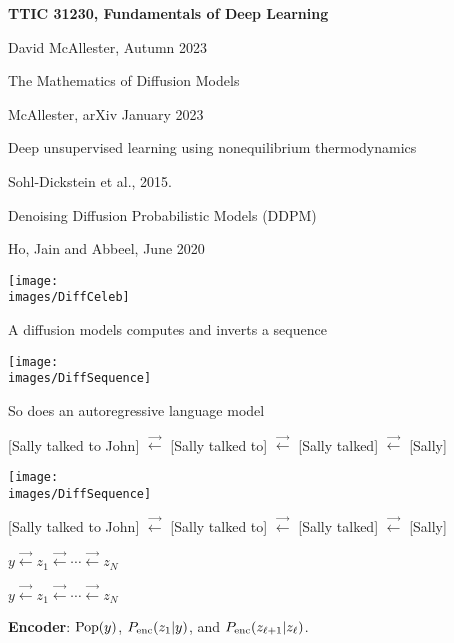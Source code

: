 





{\Huge

  \centerline{\bf TTIC 31230, Fundamentals of Deep Learning}
  \bigskip
  \centerline{David McAllester, Autumn 2023}
  \vfill
  \vfil
  \centerline{The Mathematics of Diffusion Models}
  \vfill
  \centerline{McAllester, arXiv January 2023}
    \vfill
  \vfill


\centerline{Deep unsupervised learning using nonequilibrium thermodynamics}
\centerline{Sohl-Dickstein et al., 2015.}

\vfill
\centerline{Denoising Diffusion Probabilistic Models (DDPM)}
\centerline{Ho, Jain and Abbeel, June 2020}


\vfill
\centerline{\texttt{[image: \\images/DiffCeleb]}}


A diffusion models computes and inverts a sequence

\vfill
\centerline{\texttt{[image: \\images/DiffSequence]}}

\vfill
So does an autoregressive language model

\vfill
{\huge
\centerline{{\color{red} [Sally talked to John]} $\stackrel{\rightarrow}{\leftarrow}$ {\color{red} [Sally talked to]}
$\stackrel{\rightarrow}{\leftarrow}$ {\color{red}[Sally talked]} $\stackrel{\rightarrow}{\leftarrow}$ {\color{red}[Sally]}}
}




\centerline{\texttt{[image: \\images/DiffSequence]}}

\vfill
{\huge
\centerline{{\color{red} [Sally talked to John]} $\stackrel{\rightarrow}{\leftarrow}$ {\color{red} [Sally talked to]}
$\stackrel{\rightarrow}{\leftarrow}$ {\color{red}[Sally talked]} $\stackrel{\rightarrow}{\leftarrow}$ {\color{red}[Sally]}}
}

\vfill
\centerline{$y \stackrel{\rightarrow}{\leftarrow} z_1  \stackrel{\rightarrow}{\leftarrow} \cdots \stackrel{\rightarrow}{\leftarrow} z_N$}

\centerline{$y \stackrel{\rightarrow}{\leftarrow} z_1  \stackrel{\rightarrow}{\leftarrow} \cdots \stackrel{\rightarrow}{\leftarrow} z_N$}

\vfill
{\bf Encoder}: $\mathrm{Pop}(y)$, $P_{\mathrm{enc}}(z_1|y)$, and $P_{\mathrm{enc}}(z_{\ell+1}|z_\ell)$.


}
